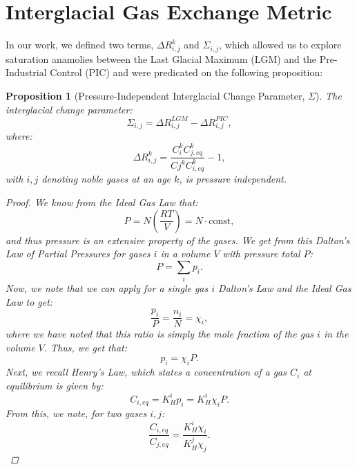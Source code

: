 \documentclass[11pt]{article}
\newtheorem*{prop}{Proposition}
\begin{document}
\section*{Interglacial Gas Exchange Metric}

In our work, we defined two terms, $\Delta R_{i,j}^k$ and $\Sigma_{i,j}$, which allowed us to explore saturation anamolies between the Last Glacial Maximum (LGM) and the Pre-Industrial Control (PIC) and were predicated on the following proposition:
\begin{prop}[Pressure-Independent Interglacial Change Parameter, $\Sigma$]
	The interglacial change parameter:
	\begin{equation*}
		\Sigma_{i,j} = \Delta R_{i,j}^{LGM} - \Delta R_{i,j}^{PIC},
	\end{equation*}
	where:
	\begin{equation*}
	    \Delta R_{i,j}^k = \frac{C_i^kC_{j, eq}^k}{Cj^kC_{i,eq}^k} - 1,
    	\end{equation*}
	with $i, j$ denoting noble gases at an age $k$, is pressure independent.
	\begin{proof}
		We know from the Ideal Gas Law that:
		\begin{equation*}
			P = N \left( \frac{RT}{V} \right) = N \cdot \text{const},
		\end{equation*}
		and thus pressure is an \emph{extensive} property of the gases. We get from this \emph{Dalton's Law of Partial Pressures} for gases $i$ in a volume $V$ with pressure total $P$:
		\begin{equation*}
			P = \sum_i p_i.
		\end{equation*}
		Now, we note that we can apply for a single gas $i$ Dalton's Law and the Ideal Gas Law to get:
		\begin{equation*}
			\frac{p_i}{P} = \frac{n_i}{N} = \chi_i,
		\end{equation*}
		where we have noted that this ratio is simply the mole fraction of the gas $i$ in the volume $V$. Thus, we get that:
		\begin{equation*}
			p_i = \chi_i P.
		\end{equation*}
		Next, we recall \emph{Henry's Law}, which states a concentration of a gas $C_i$ at equilibrium is given by:
		\begin{equation*}
			C_{i, eq} = K_H^ip_i = K_H^i\chi_iP.
		\end{equation*}
		From this, we note, for two gases $i, j$:
		\begin{equation*}
			\frac{C_{i, eq}}{C_{j, eq}} = \frac{K_H^i\chi_i}{K_H^j\chi_j}.

\end{equation*}
\end{proof}
\end{prop}
\end{document}
